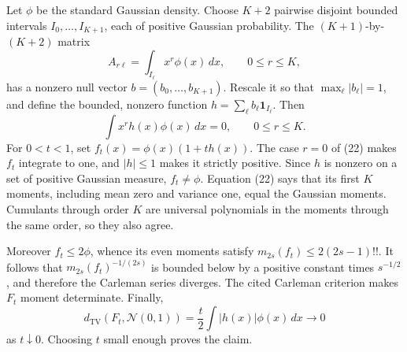 Let \(\phi\) be the standard Gaussian density. Choose \(K+2\) pairwise disjoint bounded intervals \(I_0,\ldots,I_{K+1}\), each of positive Gaussian probability. The \((K+1)\)-by-\((K+2)\) matrix
\[
 A_{r\ell}=\int_{I_\ell}x^r\phi(x)\,dx,
 \qquad 0\le r\le K,
\]
has a nonzero null vector \(b=(b_0,\ldots,b_{K+1})\). Rescale it so that \(\max_\ell|b_\ell|=1\), and define the bounded, nonzero function \(h=\sum_\ell b_\ell\mathbf 1_{I_\ell}\). Then
\[
 \int x^rh(x)\phi(x)\,dx=0,
 \qquad 0\le r\le K. \tag{22}
\]
For \(0<t<1\), set \(f_t(x)=\phi(x)(1+th(x))\). The case \(r=0\) of (22) makes \(f_t\) integrate to one, and \(|h|\le1\) makes it strictly positive. Since \(h\) is nonzero on a set of positive Gaussian measure, \(f_t\ne\phi\). Equation (22) says that its first \(K\) moments, including mean zero and variance one, equal the Gaussian moments. Cumulants through order \(K\) are universal polynomials in the moments through the same order, so they also agree.

Moreover \(f_t\le2\phi\), whence its even moments satisfy \(m_{2s}(f_t)\le2(2s-1)!!\). It follows that \(m_{2s}(f_t)^{-1/(2s)}\) is bounded below by a positive constant times \(s^{-1/2}\), and therefore the Carleman series diverges. The cited Carleman criterion makes \(F_t\) moment determinate. Finally,
\[
 d_{\mathrm{TV}}(F_t,\mathcal N(0,1))
 =\frac t2\int|h(x)|\phi(x)\,dx\longrightarrow0
\]
as \(t\downarrow0\). Choosing \(t\) small enough proves the claim.